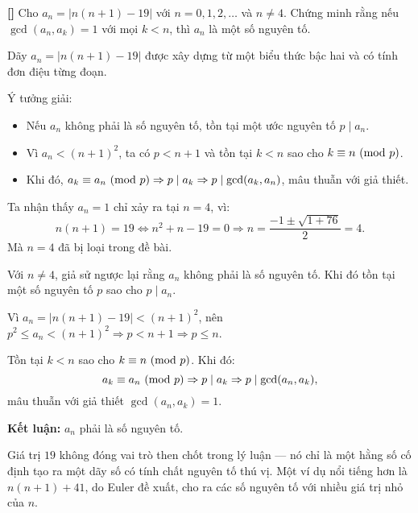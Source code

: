 \documentclass[../05-modular-arithmetic-a.tex]{subfiles}
\begin{document}
\begin{example*}\label{example:POL-2015-MO-P3}\textbf{[]}
    Cho \( a_n = |n(n+1) - 19| \) với \( n = 0, 1, 2, \ldots \) và \( n \ne 4 \).
    Chứng minh rằng nếu \( \gcd(a_n, a_k) = 1 \) với mọi \( k < n \), thì \( a_n \) là một số nguyên tố.
\end{example*}

\begin{story*}
    Dãy \( a_n = |n(n+1) - 19| \) được xây dựng từ một biểu thức bậc hai và có tính đơn điệu từng đoạn.

    Ý tưởng giải:
    \begin{itemize}[topsep=0pt, partopsep=0pt, itemsep=0pt]
        \item Nếu \( a_n \) không phải là số nguyên tố, tồn tại một ước nguyên tố \( p \mid a_n \).
        \item Vì \( a_n < (n+1)^2 \), ta có \( p < n+1 \) và tồn tại \( k < n \) sao cho \( k \equiv n \ (\mathrm{mod}\ p) \).
        \item Khi đó, \( a_k \equiv a_n \ (\mathrm{mod}\ p) \Rightarrow p \mid a_k \Rightarrow p \mid \gcd(a_k, a_n) \), mâu thuẫn với giả thiết.
    \end{itemize}
\end{story*}

\bigbreak

\begin{soln}\footnotemark
	Ta nhận thấy \( a_n = 1 \) chỉ xảy ra tại \( n = 4 \), vì:
	\[
	n(n+1) = 19 \iff n^2 + n - 19 = 0 \Rightarrow n = \frac{-1 \pm \sqrt{1 + 76}}{2} = 4.
	\]
	Mà \( n = 4 \) đã bị loại trong đề bài.

	Với \( n \ne 4 \), giả sử ngược lại rằng \( a_n \) không phải là số nguyên tố.
	Khi đó tồn tại một số nguyên tố \( p \) sao cho \( p \mid a_n \).

	Vì \( a_n = |n(n+1) - 19| < (n+1)^2 \), nên \( p^2 \le a_n < (n+1)^2 \Rightarrow p < n+1 \Rightarrow p \le n \).

	Tồn tại \( k < n \) sao cho \( k \equiv n \ (\mathrm{mod}\ p) \). Khi đó:
	\[
	a_k \equiv a_n \ (\mathrm{mod}\ p) \Rightarrow p \mid a_k \Rightarrow p \mid \gcd(a_n, a_k),
	\]
	mâu thuẫn với giả thiết \( \gcd(a_n, a_k) = 1 \).

	\textbf{Kết luận:} \( a_n \) phải là số nguyên tố.
\end{soln}

\begin{remark*}
	Giá trị \( 19 \) không đóng vai trò then chốt trong lý luận — nó chỉ là một hằng số cố định tạo ra một dãy số có tính chất nguyên tố thú vị.
	Một ví dụ nổi tiếng hơn là \( n(n+1) + 41 \), do Euler đề xuất, cho ra các số nguyên tố với nhiều giá trị nhỏ của \( n \).
\end{remark*}

\end{document}
